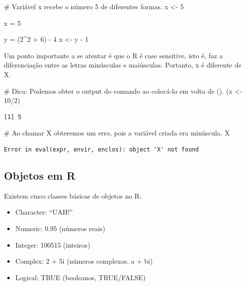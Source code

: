 \documentclass[
  letterpaper,
  DIV=11,
  numbers=noendperiod]{scrreprt}
\newenvironment{Shaded}{\begin{snugshade}}{\end{snugshade}}
\newcommand{\CommentTok}[1]{\textcolor[rgb]{0.37,0.37,0.37}{#1}}
\newcommand{\DecValTok}[1]{\textcolor[rgb]{0.68,0.00,0.00}{#1}}
\newcommand{\NormalTok}[1]{\textcolor[rgb]{0.00,0.23,0.31}{#1}}
\newcommand{\OtherTok}[1]{\textcolor[rgb]{0.00,0.23,0.31}{#1}}
\newcommand{\SpecialCharTok}[1]{\textcolor[rgb]{0.37,0.37,0.37}{#1}}
\begin{document}
\begin{Shaded}
\begin{Highlighting}[]
\CommentTok{\# Variável x recebe o número 5 de diferentes formas.}
\NormalTok{x }\OtherTok{\textless{}{-}} \DecValTok{5} 

\NormalTok{x }\OtherTok{=} \DecValTok{5}

\NormalTok{y }\OtherTok{=}\NormalTok{ (}\DecValTok{2}\SpecialCharTok{\^{}}\DecValTok{2} \SpecialCharTok{+} \DecValTok{6}\NormalTok{) }\SpecialCharTok{{-}} \DecValTok{4}
\NormalTok{x }\OtherTok{\textless{}{-}}\NormalTok{ y }\SpecialCharTok{{-}} \DecValTok{1}
\end{Highlighting}
\end{Shaded}

Um ponto importante a se atentar é que o R é case sensitive, isto é, faz
a diferenciação entre as letras minúsculas e maiúsculas. Portanto, x é
diferente de X.

\begin{Shaded}
\begin{Highlighting}[]
\CommentTok{\# Dica: Podemos obter o output do comando ao colocá{-}lo em volta de ().}
\NormalTok{(x }\OtherTok{\textless{}{-}} \DecValTok{10}\SpecialCharTok{/}\DecValTok{2}\NormalTok{)}
\end{Highlighting}
\end{Shaded}

\begin{verbatim}
[1] 5
\end{verbatim}

\begin{Shaded}
\begin{Highlighting}[]
\CommentTok{\# Ao chamar X obteremos um erro, pois a variável criada era minúscula.}
\NormalTok{X}
\end{Highlighting}
\end{Shaded}

\begin{verbatim}
Error in eval(expr, envir, enclos): object 'X' not found
\end{verbatim}

\hypertarget{objetos-em-r}{%
\subsection{Objetos em R}\label{objetos-em-r}}

Existem cinco classes básicas de objetos no R:

\begin{itemize}
\item
  Character: ``UAH!''
\item
  Numeric: 0.95 (números reais)
\item
  Integer: 100515 (inteiros)
\item
  Complex: 2 + 5i (números complexos, a + bi)
\item
  Logical: TRUE (booleanos, TRUE/FALSE)
\end{itemize}
\end{document}
